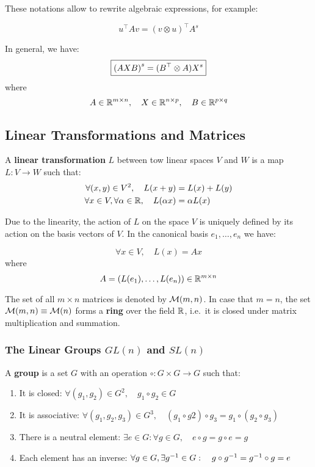 These notations allow to rewrite algebraic expressions, for example:

\[u^{\top} A v = {( v \otimes u )}^{\top} A^s\]

In general, we have:
\[
	\boxed{ {(AXB)}^s = (B^{\top} \otimes A) X^s }
\]
where
\[
	A \in \mathbb{R}^{m \times{} n}, \quad X \in \mathbb{R}^{n \times{} p}, \quad B \in \mathbb{R}^{p \times{} q}
\]

\subsection{Linear Transformations and Matrices}%
\label{sub:linear_transformations_and_matrices}

A \textbf{linear transformation} $L$ between tow linear spaces
$V$ and $W$ is a map $L : V \rightarrow W$ such that:
\begin{align*}
	\forall (x,y) \in V^2 ,\quad L(x+y) &= L(x) + L(y) \\
	\forall x \in V, \forall \alpha \in \mathbb{R},\quad L(\alpha x) &= \alpha L(x)
\end{align*}

Due to the linearity, the action of $L$ on the space $V$
is uniquely defined by its action on the basis vectors of $V$.
In the canonical basis ${e_1, \ldots, e_n}$ we have:

\[\forall x \in V, \quad L(x) = Ax\]
where
\[A = (L(e_1), \ldots, L(e_n)) \in \mathbb{R}^{m \times n}\]

The set of all $m \times n$ matrices is denoted by $\mathcal{M}(m,n)$.
In case that $m = n$, the set $\mathcal{M}(m,n) \equiv \mathcal{M}(n)$
forms a \textbf{ring} over the field $\mathbb{R}$, i.e.\ it is closed
under matrix multiplication and summation.


\subsubsection{The Linear Groups $GL(n)$ and $SL(n)$}%
\label{ssub:the_linear_groups_gl_n_and_sl_n_}

A \textbf{group} is a set $G$ with an operation
$\circ : G \times G \rightarrow G$ such that:
\begin{enumerate}
	\item It is closed:
		$\forall (g_1, g_2) \in G^2, \quad g_1 \circ g_2 \in G$
	\item It is associative:
		$\forall (g_1, g_2, g_3) \in G^3, \quad
		(g_1 \circ g2) \circ g_3 = g_1 \circ (g_2 \circ g_3)$
	\item There is a neutral element:
		$\exists e \in G: \forall g \in G, \quad
		e \circ g = g \circ e = g$
	\item Each element has an inverse:
		$\forall g \in G, \exists g^{-1} \in G : \quad
		g \circ g^{-1} = g^{-1} \circ g = e$
\end{enumerate}

